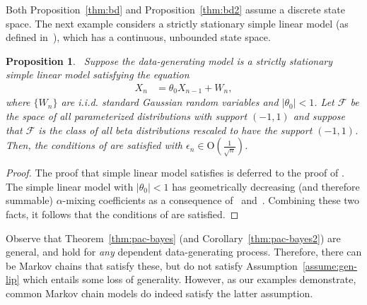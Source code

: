 \documentclass[11pt]{amsart}
\newtheorem{proposition}{Proposition}[section]
\begin{document}
Both Proposition~\ref{thm:bd} and Proposition~\ref{thm:bd2} assume a discrete state space. The next example considers a strictly stationary {simple linear model} (as defined in~), which has a continuous, unbounded state space.
%
\begin{proposition}~\label{example:slm-stationary}
Suppose the data-generating model is a strictly stationary {simple linear model} satisfying the equation
\begin{align}
    X_n & = \theta_0 X_{n-1}+W_n,
\end{align}
where $\{W_n\}$ are i.i.d. standard Gaussian random variables and $|\theta_0| < 1$. Let $\mathcal F$ be the space of all parameterized distributions with support $(-1,1)$ and suppose that $\mathcal{F}$ is the class of all beta distributions rescaled to have the support $(-1,1)$. Then, the conditions of  are satisfied with $\epsilon_n \in \mathrm{O}\left(\frac{1}{\sqrt{n}}\right)$.
\end{proposition}
\begin{proof}
The proof that simple linear model satisfies  is deferred to the proof of . The simple linear model with $|\theta_0| < 1$ has geometrically decreasing (and therefore summable) $\alpha$-mixing coefficients as a consequence of~\cite[eq. (15.49)]{meyntweedie} and~. Combining these two facts, it follows that the conditions of  are satisfied. 
\end{proof}
Observe that Theorem~\ref{thm:pac-bayes} (and Corollary~\ref{thm:pac-bayes2}) are general, and hold for {\it any} dependent data-generating process. Therefore, there can be Markov chains that satisfy these, but do not satisfy Assumption~\ref{assume:gen-lip} which entails some loss of generality. However, as our examples demonstrate, common Markov chain models do indeed satisfy the latter assumption.
\end{document}
